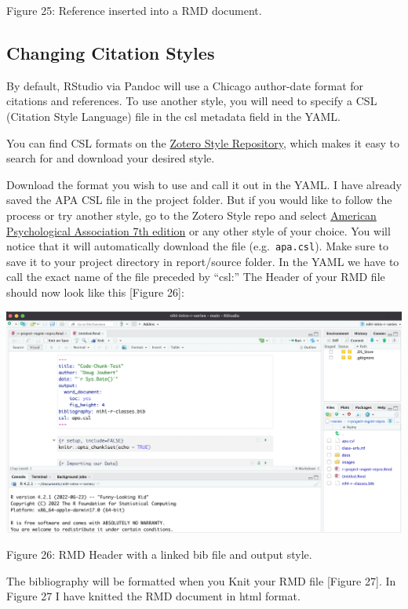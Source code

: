 \documentclass[
]{article}
\begin{document}
Figure 25: Reference inserted into a RMD document.

\hypertarget{changing-citation-styles}{%
\subsection{\texorpdfstring{\textbf{Changing Citation
Styles}}{Changing Citation Styles}}\label{changing-citation-styles}}

By default, RStudio via Pandoc will use a Chicago author-date format for
citations and references. To use another style, you will need to specify
a CSL (Citation Style Language) file in the csl metadata field in the
YAML.

You can find CSL formats on the
\href{https://www.zotero.org/styles}{Zotero Style Repository}, which
makes it easy to search for and download your desired style.

Download the format you wish to use and call it out in the YAML. I have
already saved the APA CSL file in the project folder. But if you would
like to follow the process or try another style, go to the Zotero Style
repo and select \href{https://www.zotero.org/styles/apa}{American
Psychological Association 7th edition} or any other style of your
choice. You will notice that it will automatically download the file
(e.g.~\texttt{apa.csl}). Make sure to save it to your project directory
in report/source folder. In the YAML we have to call the exact name of
the file preceded by ``csl:'' The Header of your RMD file should now
look like this {[}Figure 26{]}:

\includegraphics[width=6.66667in,height=\textheight]{images/bib-10.png}

Figure 26: RMD Header with a linked bib file and output style.

The bibliography will be formatted when you Knit your RMD file {[}Figure
27{]}. In Figure 27 I have knitted the RMD document in html format.
\end{document}
